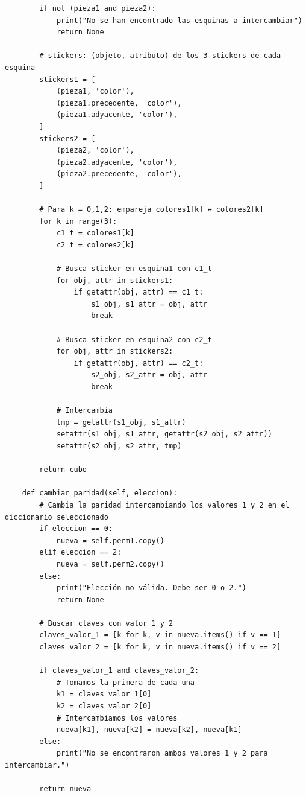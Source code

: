 \begin{lstlisting}
        if not (pieza1 and pieza2):
            print("No se han encontrado las esquinas a intercambiar")
            return None

        # stickers: (objeto, atributo) de los 3 stickers de cada esquina
        stickers1 = [
            (pieza1, 'color'),
            (pieza1.precedente, 'color'),
            (pieza1.adyacente, 'color'),
        ]
        stickers2 = [
            (pieza2, 'color'),
            (pieza2.adyacente, 'color'),
            (pieza2.precedente, 'color'),
        ]

        # Para k = 0,1,2: empareja colores1[k] ↔ colores2[k]
        for k in range(3):
            c1_t = colores1[k]
            c2_t = colores2[k]

            # Busca sticker en esquina1 con c1_t
            for obj, attr in stickers1:
                if getattr(obj, attr) == c1_t:
                    s1_obj, s1_attr = obj, attr
                    break

            # Busca sticker en esquina2 con c2_t
            for obj, attr in stickers2:
                if getattr(obj, attr) == c2_t:
                    s2_obj, s2_attr = obj, attr
                    break

            # Intercambia
            tmp = getattr(s1_obj, s1_attr)
            setattr(s1_obj, s1_attr, getattr(s2_obj, s2_attr))
            setattr(s2_obj, s2_attr, tmp)

        return cubo
        
    def cambiar_paridad(self, eleccion):
        # Cambia la paridad intercambiando los valores 1 y 2 en el diccionario seleccionado
        if eleccion == 0:
            nueva = self.perm1.copy()
        elif eleccion == 2:
            nueva = self.perm2.copy()
        else:
            print("Elección no válida. Debe ser 0 o 2.")
            return None

        # Buscar claves con valor 1 y 2
        claves_valor_1 = [k for k, v in nueva.items() if v == 1]
        claves_valor_2 = [k for k, v in nueva.items() if v == 2]

        if claves_valor_1 and claves_valor_2:
            # Tomamos la primera de cada una
            k1 = claves_valor_1[0]
            k2 = claves_valor_2[0]
            # Intercambiamos los valores
            nueva[k1], nueva[k2] = nueva[k2], nueva[k1]
        else:
            print("No se encontraron ambos valores 1 y 2 para intercambiar.")

        return nueva
                

\end{lstlisting}
